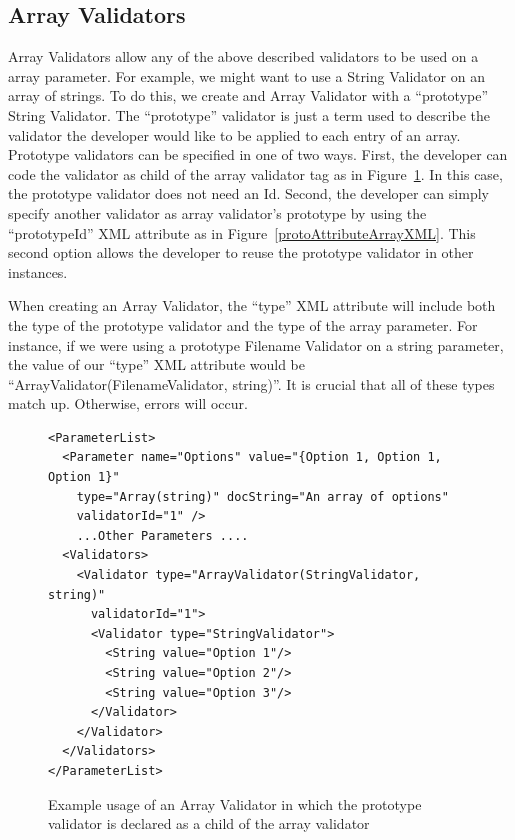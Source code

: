 \subsection{Array Validators}
Array Validators allow any of the above described validators to be used on a array parameter. For example, we might want to use a
String Validator on an array of strings. To do this, we create and Array Validator with a ``prototype'' String Validator. The 
``prototype'' validator is just a term used to describe the validator the developer would like to be applied to each entry of an
array. Prototype validators can be specified in one of two ways. First, the developer can code the validator as child of the array validator
tag as in Figure~\ref{actualArrayValidatorXML}. In this case, the prototype validator does not need an Id. 
Second, the developer can simply specify another validator as array validator's  prototype by using the
``prototypeId'' XML attribute as in Figure~\ref{protoAttributeArrayXML}. This second option allows the developer to reuse the prototype validator in 
other instances.

When creating an Array Validator, the ``type'' XML attribute will include both the type of the prototype validator and the type of the array
parameter. For instance, if we were using a prototype Filename Validator on a string parameter, the value of our ``type'' XML attribute would
be ``ArrayValidator(FilenameValidator, string)''. It is crucial that all of these types match up. Otherwise, errors will occur.

\begin{figure}
\centering
{\footnotesize
\begin{Verbatim}
<ParameterList>
  <Parameter name="Options" value="{Option 1, Option 1, Option 1}" 
    type="Array(string)" docString="An array of options" 
    validatorId="1" />
    ...Other Parameters ....
  <Validators>
    <Validator type="ArrayValidator(StringValidator, string)" 
      validatorId="1">
      <Validator type="StringValidator">
        <String value="Option 1"/>
        <String value="Option 2"/>
        <String value="Option 3"/>
      </Validator>
    </Validator>
  </Validators>
</ParameterList>
\end{Verbatim}
}
\caption{Example usage of an Array Validator in which the prototype validator is declared as a child of the array validator}
\label{actualArrayValidatorXML}
\end{figure}

